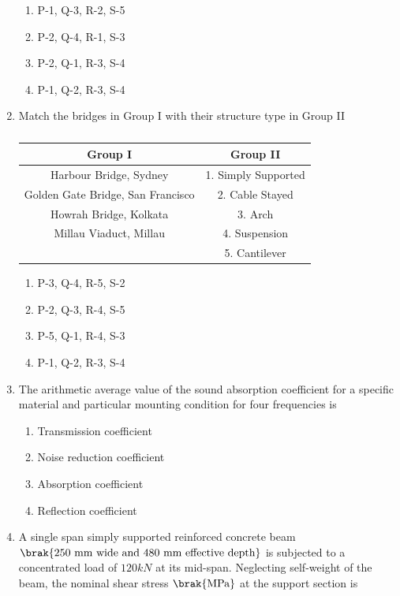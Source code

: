 \documentclass[journal,12pt,onecolumn]{IEEEtran}
\theoremstyle{remark}
\begin{document}
\begin{enumerate}
\hfill{}
\begin{enumerate}
\item P-1, Q-3, R-2, S-5
\item P-2, Q-4, R-1, S-3
\item P-2, Q-1, R-3, S-4
\item P-1, Q-2, R-3, S-4
\end{enumerate}

\item Match the bridges in Group I with their structure type in Group II

\begin{table}[H]
\centering
\begin{tabular}{c|c}
\textbf{Group I} & \textbf{Group II}\\
\hline
Harbour Bridge, Sydney & 1. Simply Supported \\
Golden Gate Bridge, San Francisco & 2. Cable Stayed \\
Howrah Bridge, Kolkata & 3. Arch \\
Millau Viaduct, Millau & 4. Suspension \\
 & 5. Cantilever \\
\end{tabular}
\caption*{}
\label{Q.38}
\end{table}

\hfill{}
\begin{enumerate}
\item P-3, Q-4, R-5, S-2
\item P-2, Q-3, R-4, S-5
\item P-5, Q-1, R-4, S-3
\item P-1, Q-2, R-3, S-4
\end{enumerate}

\item The arithmetic average value of the sound absorption coefficient for a specific material and particular mounting condition for four frequencies is

\hfill{}
\begin{enumerate}
\item Transmission coefficient
\item Noise reduction coefficient
\item Absorption coefficient
\item Reflection coefficient
\end{enumerate}

\item A single span simply supported reinforced concrete beam $\brak{\text{250 mm wide and 480 mm effective depth}}$ is subjected to a concentrated load of $120 kN$ at its mid-span. Neglecting self-weight of the beam, the nominal shear stress $\brak{\text{MPa}}$ at the support section is\underline{\hspace{3cm}}


\end{enumerate}
\end{document}
